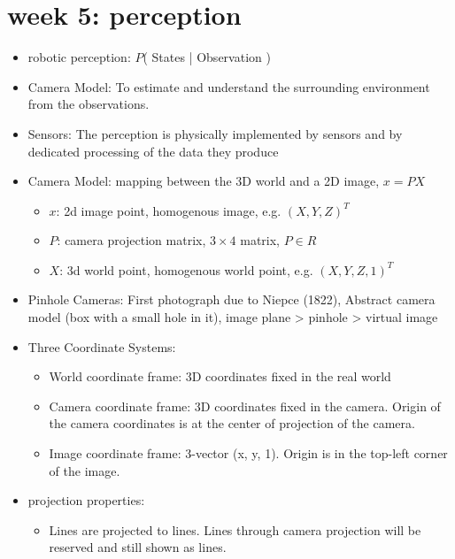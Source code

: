 \documentclass[10pt]{article}
\begin{document}
\section*{week 5: perception}

\begin{itemize}[label=\(\star\), leftmargin=1em, itemsep=-0.3em]
    \item robotic perception: $P$( States | Observation )
    \item Camera Model: To estimate and understand the surrounding environment from the observations.
    \item Sensors: The perception is physically implemented by sensors and by dedicated processing of the data they produce
    \item Camera Model: mapping between the 3D world and a 2D image, $x=PX$
          \begin{itemize}[label=\(\star\), leftmargin=1em, itemsep=-0.3em]
              \item $x$: 2d image point, homogenous image, e.g. $(X,Y,Z)^T$
              \item $P$: camera projection matrix, $3\times 4$ matrix, $P\in R$
              \item $X$: 3d world point, homogenous world point, e.g. $(X,Y,Z,1)^T$
          \end{itemize}
    \item Pinhole Cameras: First photograph due to Niepce (1822), Abstract camera model (box with a small hole in it), image plane > pinhole > virtual image
    \item Three Coordinate Systems:
          \begin{itemize}[label=\(\star\), leftmargin=1em, itemsep=-0.3em]
              \item World coordinate frame: 3D coordinates fixed in the real world
              \item Camera coordinate frame: 3D coordinates fixed in the camera. Origin of the camera coordinates is at the center of projection of the camera.
              \item Image coordinate frame: 3-vector (x, y, 1). Origin is in the top-left corner of the image.
          \end{itemize}
    \item projection properties:
          \begin{itemize}[label=\(\star\), leftmargin=1em, itemsep=-0.3em]
              \item Lines are projected to lines. Lines through camera projection will be reserved and still shown as lines.

\end{itemize}
\end{itemize}
\end{document}
